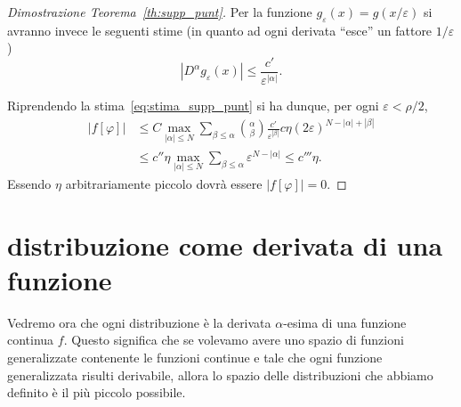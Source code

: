 \documentclass[italian,a4paper,oneside,headinclude]{scrbook}
\newcommand{\eps}{\varepsilon}
\renewcommand{\phi}{\varphi}
\newcommand{\abs}[1]{{\left|#1\right|}}
\begin{document}
\begin{proof}[Dimostrazione Teorema~\ref{th:supp_punt}]
  Per la funzione $g_\eps(x) = g(x/\eps)$
  si avranno invece le seguenti stime (in
  quanto ad ogni derivata ``esce'' un fattore $1/\eps$)
  \[
    \abs{D^\alpha g_\eps(x)} \le \frac{c'}{\eps^{\abs{\alpha}}}.
  \]

  Riprendendo la stima~\eqref{eq:stima_supp_punt} si ha dunque, per
  ogni $\eps<\rho/2$,
  \begin{align*}
    \abs{f[\phi]}
    & \le C\max_{\abs{\alpha}\le N}\sum_{\beta\le\alpha}
    {\alpha \choose \beta}\frac{c'}{\eps^{\abs{\beta}}}
    c\eta (2\eps)^{N-\abs{\alpha}+\abs{\beta}} \\
    & \le c'' \eta \max_{\abs{\alpha}\le N}\sum_{\beta\le \alpha}\eps^{N-\abs{\alpha}}
    \le c''' \eta.
  \end{align*}
  Essendo $\eta$ arbitrariamente piccolo dovrà essere $\abs{f[\phi]}=0$.
\end{proof}

\section{distribuzione come derivata di una funzione}

Vedremo ora che ogni distribuzione è la derivata $\alpha$-esima di una
funzione continua $f$. Questo significa che se volevamo avere uno
spazio di funzioni generalizzate contenente le funzioni continue e
tale che ogni funzione generalizzata risulti derivabile, allora lo
spazio delle distribuzioni che abbiamo definito è il più piccolo
possibile.
\end{document}
